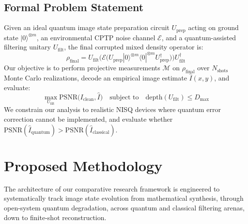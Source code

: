 \documentclass[12pt,onecolumn,draftclsnofoot]{IEEEtran}
\begin{document}
\subsection{Formal Problem Statement}
Given an ideal quantum image state preparation circuit $U_{\text{prep}}$ acting on ground state $|0\rangle^{\otimes m}$, an environmental CPTP noise channel $\mathcal{E}$, and a quantum-assisted filtering unitary $U_{\text{filt}}$, the final corrupted mixed density operator is:
\begin{equation}
\rho_{\text{final}} = U_{\text{filt}} \Big( \mathcal{E}\big( U_{\text{prep}} |0\rangle^{\otimes m} \langle 0|^{\otimes m} U_{\text{prep}}^\dagger \big) \Big) U_{\text{filt}}^\dagger
\end{equation}
Our objective is to perform projective measurements $\mathcal{M}$ on $\rho_{\text{final}}$ over $N_{\text{shots}}$ Monte Carlo realizations, decode an empirical image estimate $\hat{I}(x, y)$, and evaluate:
\begin{equation}
\max_{U_{\text{filt}}} \text{PSNR}\big(I_{\text{clean}}, \hat{I}\big) \quad \text{subject to} \quad \text{depth}(U_{\text{filt}}) \le D_{\text{max}}
\end{equation}
We constrain our analysis to realistic NISQ devices where quantum error correction cannot be implemented, and evaluate whether $\text{PSNR}(\hat{I}_{\text{quantum}}) > \text{PSNR}(\hat{I}_{\text{classical}})$.

\section{Proposed Methodology}
The architecture of our comparative research framework is engineered to systematically track image state evolution from mathematical synthesis, through open-system quantum degradation, across quantum and classical filtering arenas, down to finite-shot reconstruction.
\end{document}
